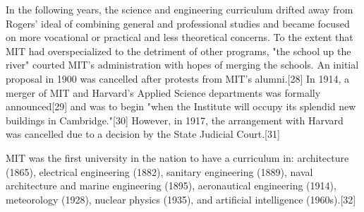 In the following years, the science and engineering curriculum drifted away from Rogers' ideal of combining general and professional studies and became focused on more vocational or practical and less theoretical concerns. To the extent that MIT had overspecialized to the detriment of other programs, "the school up the river" courted MIT’s administration with hopes of merging the schools. An initial proposal in 1900 was cancelled after protests from MIT's alumni.[28] In 1914, a merger of MIT and Harvard's Applied Science departments was formally announced[29] and was to begin "when the Institute will occupy its splendid new buildings in Cambridge."[30] However, in 1917, the arrangement with Harvard was cancelled due to a decision by the State Judicial Court.[31]

MIT was the first university in the nation to have a curriculum in: architecture (1865), electrical engineering (1882), sanitary engineering (1889), naval architecture and marine engineering (1895), aeronautical engineering (1914), meteorology (1928), nuclear physics (1935), and artificial intelligence (1960s).[32]
